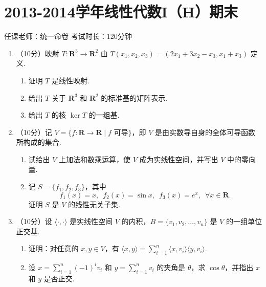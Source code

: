 \section{2013-2014学年线性代数I（H）期末}

\begin{center}
    任课老师：统一命卷\hspace{4em} 考试时长：120分钟
\end{center}

\begin{enumerate}
    \item （10分）映射 $T\colon \mathbf{R}^3 \to \mathbf{R}^2$ 由 $T(x_1,x_2,x_3)=(2x_1+3x_2-x_3,x_1+x_3)$ 定义.
    \begin{enumerate}
        \item 证明 $T$ 是线性映射.

        \item 给出 $T$ 关于 $\mathbf{R}^3$ 和 $\mathbf{R}^2$ 的标准基的矩阵表示.

        \item 给出 $T$ 的核 $\ker T$ 的一组基.
    \end{enumerate}

    \item （10分）记 $V=\{f\colon \mathbf{R}\to \mathbf{R}\mid f \text{~可导} \}$，即 $V$ 是由实数导自身的全体可导函数所构成的集合.
    \begin{enumerate}
        \item 试给出 $V$ 上加法和数乘运算，使 $V$ 成为实线性空间，并写出 $V$ 中的零向量.

        \item 记 $S=\{f_1,f_2,f_3\}$，其中
        \[f_1(x)=x, \enspace f_2(x)=\sin x, \enspace f_3(x)=e^x,\enspace \forall x \in \mathbf{R}.\]
        证明 $S$ 是 $V$ 的线性无关子集.
    \end{enumerate}

    \item （10分）设 $\langle\cdot,\cdot\rangle$ 是实线性空间 $V$ 的内积，$B=\{v_1,v_2,\ldots,v_n\}$ 是 $V$ 的一组单位正交基.
    \begin{enumerate}
        \item 证明：对任意的 $x,y \in V$，有 $\langle x,y\rangle = \sum\limits_{i=1}^n\langle x,v_i\rangle\langle y,v_i\rangle$.

        \item 设 $x=\sum\limits_{i=1}^n(-1)^iv_i$ 和 $y=\sum\limits_{i=1}^nv_i$ 的夹角是 $\theta$，求 $\cos \theta$，并指出 $x$ 和 $y$ 是否正交.
    \end{enumerate}


\end{enumerate}
